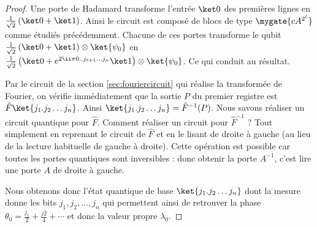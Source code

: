 \documentclass[11pt,class=report,crop=false]{standalone}
\begin{document}
\begin{proof}
Une porte de Hadamard  transforme l'entrée $\ket0$ des premières lignes en 
$\frac{1}{\sqrt2}\left(\ket0+\ket1\right)$.
Ainsi le circuit est composé de blocs de type $\mygate{cA^{2^\ell}}$ comme étudiés précédemment.
Chacune de ces portes transforme le qubit $\frac{1}{\sqrt2}\left(\ket0+\ket1\right) \otimes \ket{\psi_0}$
en $\frac{1}{\sqrt2}\left(\ket0+ e^{2\ii\pi 0..j_{\ell+1} \ldots j_n}\ket1\right) \otimes \ket{\psi_0}$. Ce qui conduit au résultat.

Par le circuit de la section \ref{sec:fouriercircuit} qui réalise la transformée de Fourier, on vérifie immédiatement que la sortie $P$ du premier registre est $\hat F\ket{j_1.j_2\ldots j_n}$.
Ainsi
$\ket{j_1.j_2\ldots j_n} = \hat F^{-1}(P)$.  
Nous savons réaliser un circuit quantique pour $\hat F$. Comment réaliser un circuit pour $\hat F^{-1}$ ? Tout simplement en reprenant le circuit de $\hat F$ et en le lisant de droite à gauche (au lieu de la lecture habituelle de gauche à droite). Cette opération est possible car toutes les portes quantiques sont inversibles : donc obtenir la porte $A^{-1}$, c'est lire une porte $A$ de droite à gauche.

Nous obtenons donc l'état quantique de base $\ket{j_1.j_2\ldots j_n}$ dont la mesure donne les bits $j_1,j_2,\ldots,j_n$ qui permettent ainsi de retrouver la phase $\theta_0
= \frac{j_1}{2}+\frac{j2}{4}+\cdots$ et donc la valeur propre $\lambda_0$.
\end{proof}
\end{document}
